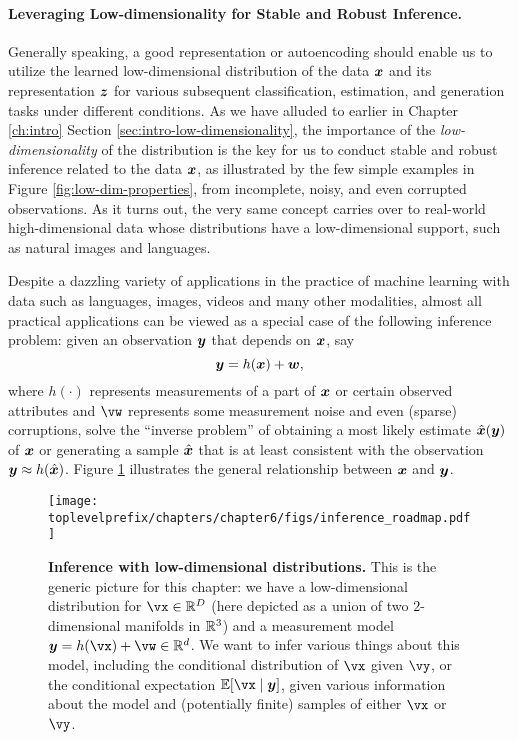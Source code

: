 \documentclass[../../book-main.tex]{subfiles}
\begin{document}
\paragraph{Leveraging Low-dimensionality for Stable and Robust Inference.}
Generally speaking, a good representation or autoencoding should enable us to utilize the learned low-dimensional distribution of the data $\bm{x}$ and its representation $\bm{z}$ for various subsequent classification, estimation, and generation tasks under different conditions. As we have alluded to earlier in Chapter \ref{ch:intro} Section \ref{sec:intro-low-dimensionality}, the importance of the {\em low-dimensionality} of the distribution is the key for us to conduct stable and robust inference related to the data $\bm{x}$, as illustrated by the few simple examples in Figure \ref{fig:low-dim-properties}, from incomplete, noisy, and even corrupted observations. As it turns out, the very same concept carries over to real-world high-dimensional data whose distributions have a low-dimensional support, such as natural images and languages. 

Despite a dazzling variety of applications in the practice of machine learning with data such as languages, images, videos and many other modalities, almost all practical applications can be viewed as a special case of the following inference problem: given an observation $\bm{y}$ that depends on $\bm{x}$, say
\begin{equation}
    \bm{y} = h(\bm{x}) + \boldsymbol{w},
\end{equation}
where $h(\cdot)$ represents measurements of a part of $\bm{x}$ or certain observed attributes and $\vw$ represents some measurement noise and even (sparse) corruptions, solve the ``inverse problem'' of obtaining a most likely estimate $\hat {\bm{x}}(\bm{y})$ of $\bm{x}$ or generating a sample $\hat{\bm{x}}$ that is at least consistent with the observation $\bm{y} \approx h(\hat{\bm{x}})$. Figure \ref{fig:inference_roadmap} illustrates the general relationship between $\bm{x}$ and $\bm{y}$. 

\begin{figure}
  \centering 
  \texttt{[image: \\toplevelprefix/chapters/chapter6/figs/inference\_roadmap.pdf]}
  \caption{\small \textbf{Inference with low-dimensional distributions.} This is the generic picture for this chapter: we have a low-dimensional distribution for \(\vx \in \R^{D}\) (here depicted as a union of two \(2\)-dimensional manifolds in \(\mathbb{R}^{3}\)) and a measurement model \(\y = h(\vx) + \vw \in \R^{d}\). We want to infer various things about this model, including the conditional distribution of \(\vx\) given \(\vy\), or the conditional expectation \(\mathbb{E}[\vx \mid \y]\), given various information about the model and (potentially finite) samples of either \(\vx\) or \(\vy\).}
  \label{fig:inference_roadmap}
\end{figure}
\end{document}
